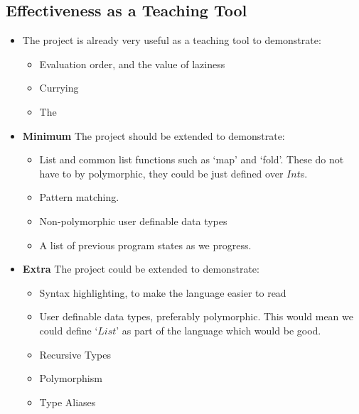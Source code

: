 \subsection{Effectiveness as a Teaching Tool}
\begin{itemize}
    \item The project is already very useful as a teaching tool to demonstrate:
    \begin{itemize}
        \item Evaluation order, and the value of laziness
        \item Currying
        \item The \lcalc
    \end{itemize}
    \item \textbf{Minimum} The project should be extended to demonstrate:
    \begin{itemize}
        \item List and common list functions such as `map' and `fold'. These do not have to by polymorphic, they could be just defined over $Int$s. 
        \item Pattern matching.
        \item Non-polymorphic user definable data types
        \item A list of previous program states as we progress.
    \end{itemize}
    \item \textbf{Extra} The project could be extended to demonstrate:
    \begin{itemize}
        \item Syntax highlighting, to make the language easier to read   
        \item User definable data types, preferably polymorphic. This would mean we could define `$List$' as part of the language which would be good. 
        \item Recursive Types
        \item Polymorphism
        \item Type Aliases
    \end{itemize}
\end{itemize}

